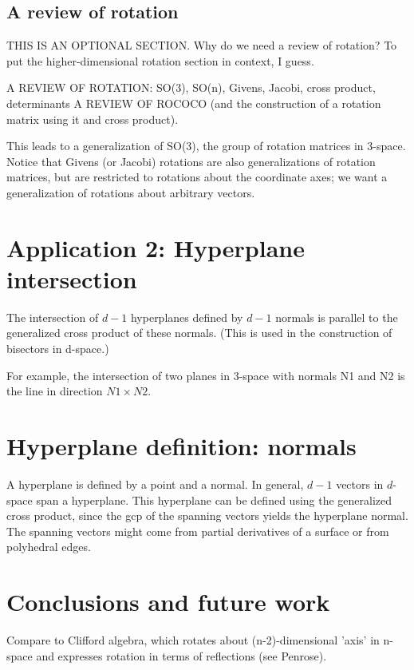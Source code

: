 \documentclass[10pt]{article}
\begin{document}
\subsection{A review of rotation}

THIS IS AN OPTIONAL SECTION.
Why do we need a review of rotation?  To put the higher-dimensional rotation section in context, I guess.

A REVIEW OF ROTATION: SO(3), SO(n), Givens, Jacobi, cross product, determinants
A REVIEW OF ROCOCO (and the construction of a rotation matrix using it 
and cross product).

This leads to a generalization of SO(3), the group of rotation matrices in 3-space.
Notice that Givens (or Jacobi) rotations \cite{golubvanLoan} are also 
generalizations
of rotation matrices, but are restricted to rotations about the coordinate axes;
we want a generalization of rotations about arbitrary vectors.

\clearpage

\section{Application 2: Hyperplane intersection}

The intersection of $d-1$ hyperplanes defined by $d-1$ normals is parallel 
to the generalized cross product of these normals.
(This is used in the construction of bisectors in d-space.)

For example, the intersection of two planes in 3-space with normals N1 and N2 
is the line in direction $N1 \times N2$.


\section{Hyperplane definition: normals}

A hyperplane is defined by a point and a normal.
In general, $d-1$ vectors in $d$-space span a hyperplane.
This hyperplane can be defined using the generalized cross product,
since the gcp of the spanning vectors yields the hyperplane normal.
The spanning vectors might come from partial derivatives of a surface
or from polyhedral edges.

\section{Conclusions and future work}

Compare to Clifford algebra, which rotates about (n-2)-dimensional 'axis' in n-space
and expresses rotation in terms of reflections (see Penrose).
\end{document}
